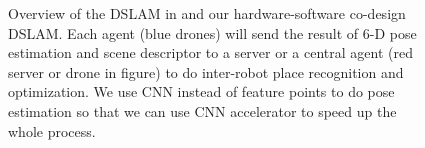 \begin{figure}[thb]
    \begin{minipage}[t]{0.5\linewidth}  
    \centering
    \end{minipage}
    \begin{minipage}[t]{0.5\linewidth}  
    \centering  
    \end{minipage}
    \caption{Overview of the DSLAM in \cite{Cieslewski:20187ee} and our hardware-software co-design DSLAM. Each agent (blue drones) will send the result of 6-D pose estimation and scene descriptor to a server or a central agent (red server or drone in figure) to do inter-robot place recognition and optimization. We use CNN instead of feature points to do pose estimation so that we can use CNN accelerator to speed up the whole process.}
\label{fig:overview}
\end{figure}


